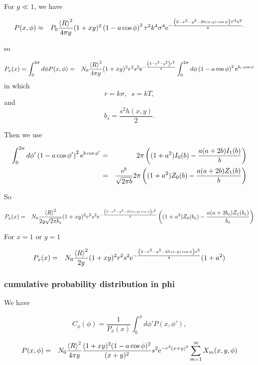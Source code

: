\documentclass[11pt,openany]{report}
\newcommand{\e}{{\rm e}}
\begin{document}
{{For $g\ll 1$, we have

\begin{eqnarray}
P(x,\phi)
&\approx&P_{0}\frac{\left<R\right>^{2}}{4\pi y}(1+xy)^{2}\left(1-a\cos\phi\right)^{2}\tau^{2}k^{4}\sigma^{4}\e^{-\frac{\left(2-x^{2}-y^{2}-2h(x,y)\cos\phi\right)T^{2}k^{2}}{4}.}
\end{eqnarray}

so

\begin{eqnarray}
P_{x}(x)=\int_{0}^{2\pi}d\phi P(x,\phi)&=& N_{0}\frac{\left<R\right>^{2}}{4\pi y}(1+xy)^{2}r^{2}s^{2}\e^{-\frac{\left(2-x^{2}-y^{2}\right)s^{2}}{4}}
\int_{0}^{2\pi}d\phi\left(1-a\cos\phi\right)^{2}\e^{b_{s}\cos\phi}
\end{eqnarray}
in which
$$r=k\sigma,\;\;s=kT,$$
and
$$b_{s}=\frac{s^{2}h(x,y)}{2}.$$

Then we use

\begin{eqnarray}
\int_{0}^{2\pi}d\phi'\left(1-a\cos\phi' \right)^{2}\e^{b\cos\phi'}&=&
2\pi\left((1+a^{2})I_{0}(b)-\frac{a(a+2b)I_{1}(b)}{b}\right)\\
&=&\frac{\e^{b}}{\sqrt{2\pi b}}2\pi\left((1+a^{2})Z_{0}(b)-\frac{a(a+2b)Z_{1}(b)}{b}\right)
\end{eqnarray}

So

\begin{eqnarray}
P_{x}(x)&=& N_{0}\frac{\left<R\right>^{2}}{2 y\sqrt{2\pi b_{s}}}(1+xy)^{2}r^{2}s^{2}\e^{-\frac{\left(2-x^{2}-y^{2}-2h(x,y)\cos\phi\right)s^{2}}{4}}
\left((1+a^{2})Z_{0}(b_{s})-\frac{a(a+2b_{s})Z_{1}(b_{s})}{b_{s}}\right)
\end{eqnarray}

For $x=1$ or $y=1$

\begin{eqnarray}
P_{x}(x)&=& N_{0}\frac{\left<R\right>^{2}}{2 y}(1+xy)^{2}r^{2}s^{2}\e^{-\frac{\left(2-x^{2}-y^{2}-2h(x,y)\cos\phi\right)s^{2}}{4}}
(1+a^{2})
\end{eqnarray}

\subsubsection{cumulative probability distribution in phi}
We have

$$C_{\phi}(\phi)=\frac{1}{P_x(x)}\int_{0}^{\phi}d\phi'P(x,\phi'),$$

\begin{eqnarray}
P(x,\phi)&=&
 N_{0}\frac{\left<R\right>^{2}}{4\pi y}\frac{(1+xy)^{2}(1-a\cos\phi)^{2}}{(x+y)^{2}}s^{2}\e^{-r^{2}(x+y)^{2}}\sum_{m=1}^{\infty}X_{m}(x,y,\phi)
\end{eqnarray}

}}
\end{document}
